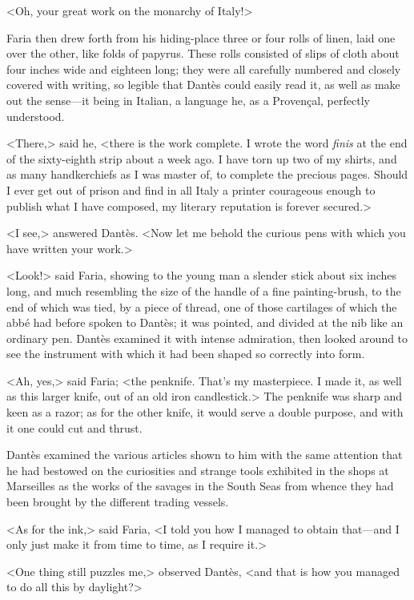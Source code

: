  <Oh, your great work on the monarchy of Italy!> 

 Faria then drew forth from his hiding-place three or four rolls of linen, laid one over the other, like folds of papyrus. These rolls consisted of slips of cloth about four inches wide and eighteen long; they were all carefully numbered and closely covered with writing, so legible that Dantès could easily read it, as well as make out the sense—it being in Italian, a language he, as a Provençal, perfectly understood. 

 <There,> said he, <there is the work complete. I wrote the word \textit{finis} at the end of the sixty-eighth strip about a week ago. I have torn up two of my shirts, and as many handkerchiefs as I was master of, to complete the precious pages. Should I ever get out of prison and find in all Italy a printer courageous enough to publish what I have composed, my literary reputation is forever secured.> 

 <I see,> answered Dantès. <Now let me behold the curious pens with which you have written your work.> 

 <Look!> said Faria, showing to the young man a slender stick about six inches long, and much resembling the size of the handle of a fine painting-brush, to the end of which was tied, by a piece of thread, one of those cartilages of which the abbé had before spoken to Dantès; it was pointed, and divided at the nib like an ordinary pen. Dantès examined it with intense admiration, then looked around to see the instrument with which it had been shaped so correctly into form. 

 <Ah, yes,> said Faria; <the penknife. That's my masterpiece. I made it, as well as this larger knife, out of an old iron candlestick.> The penknife was sharp and keen as a razor; as for the other knife, it would serve a double purpose, and with it one could cut and thrust. 

 Dantès examined the various articles shown to him with the same attention that he had bestowed on the curiosities and strange tools exhibited in the shops at Marseilles as the works of the savages in the South Seas from whence they had been brought by the different trading vessels. 

 <As for the ink,> said Faria, <I told you how I managed to obtain that—and I only just make it from time to time, as I require it.> 

 <One thing still puzzles me,> observed Dantès, <and that is how you managed to do all this by daylight?> 

